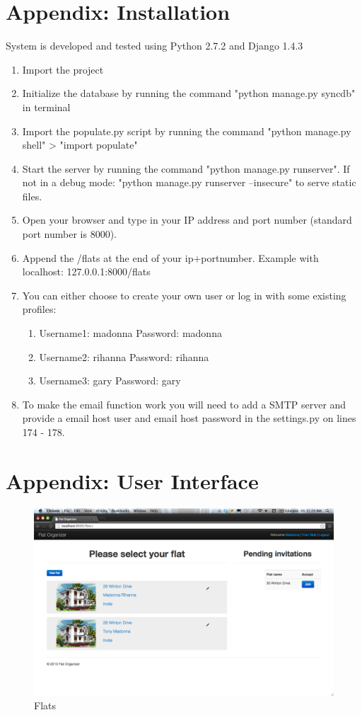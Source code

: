 \documentclass{sig-alt-release2}
\begin{document}
\section{Appendix: Installation}
\noindent System is developed and tested using Python 2.7.2 and Django 1.4.3
\begin{enumerate}
\item Import the project
\item Initialize the database by running the command "python manage.py syncdb" in terminal
\item Import the populate.py script by running the command "python manage.py shell" > "import populate"
\item Start the server by running the command "python manage.py runserver". If not in a debug mode: "python manage.py runserver --insecure" to serve static files.
\item Open your browser and type in your IP address and port number (standard port number is 8000).
\item Append the /flats at the end of your ip+portnumber. Example with localhost: 127.0.0.1:8000/flats
\item You can either choose to create your own user or log in with some existing profiles:
\begin{enumerate}
\item Username1: madonna Password: madonna
\item Username2: rihanna Password: rihanna
\item Username3: gary Password: gary
\end{enumerate}
\item To make the email function work you will need to add a SMTP server and provide a email host user and email host password in the settings.py on lines 174 - 178.
\end{enumerate}

\section{Appendix: User Interface}

\begin{figure}[!ht]
\centering
\includegraphics[scale=0.2]{flats_shot}
\caption{Flats}
\label{fig:flats_shot}
\end{figure}
\end{document}
